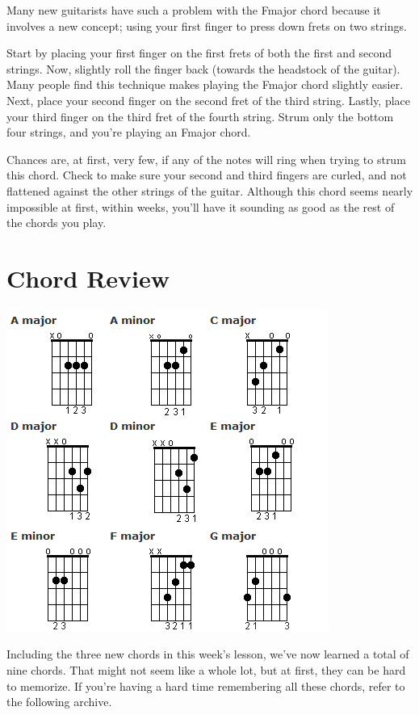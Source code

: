 Many new guitarists have such a problem with the Fmajor chord because it
involves a new concept; using your first finger to press down frets on two
strings.

Start by placing your first finger on the first frets of both the first and
second strings. Now, slightly roll the finger back (towards the headstock of
the guitar). Many people find this technique makes playing the Fmajor chord
slightly easier. Next, place your second finger on the second fret of the third
string. Lastly, place your third finger on the third fret of the fourth string.
Strum only the bottom four strings, and you're playing an Fmajor chord.

Chances are, at first, very few, if any of the notes will ring when trying to
strum this chord. Check to make sure your second and third fingers are curled,
and not flattened against the other strings of the guitar. Although this chord
seems nearly impossible at first, within weeks, you'll have it sounding as good
as the rest of the chords you play.

\section{Chord Review}
\includegraphics{partthree/lesson-three-chord-chart.png}

Including the three new chords in this week's lesson, we've now learned a total
of nine chords. That might not seem like a whole lot, but at first, they can be
hard to memorize. If you're having a hard time remembering all these chords,
refer to the following archive.

